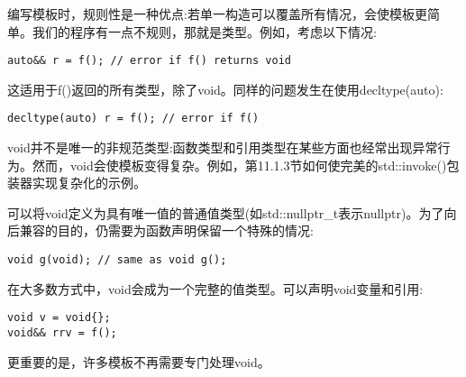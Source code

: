 编写模板时，规则性是一种优点:若单一构造可以覆盖所有情况，会使模板更简单。我们的程序有一点不规则，那就是类型。例如，考虑以下情况:

\begin{lstlisting}[style=styleCXX]
auto&& r = f(); // error if f() returns void
\end{lstlisting}

这适用于f()返回的所有类型，除了void。同样的问题发生在使用decltype(auto):

\begin{lstlisting}[style=styleCXX]
decltype(auto) r = f(); // error if f()
\end{lstlisting}

void并不是唯一的非规范类型:函数类型和引用类型在某些方面也经常出现异常行为。然而，void会使模板变得复杂。例如，第11.1.3节如何使完美的std::invoke()包装器实现复杂化的示例。

可以将void定义为具有唯一值的普通值类型(如std::nullptr\_t表示nullptr)。为了向后兼容的目的，仍需要为函数声明保留一个特殊的情况:

\begin{lstlisting}[style=styleCXX]
void g(void); // same as void g();
\end{lstlisting}

在大多数方式中，void会成为一个完整的值类型。可以声明void变量和引用:

\begin{lstlisting}[style=styleCXX]
void v = void{};
void&& rrv = f();
\end{lstlisting}

更重要的是，许多模板不再需要专门处理void。













































